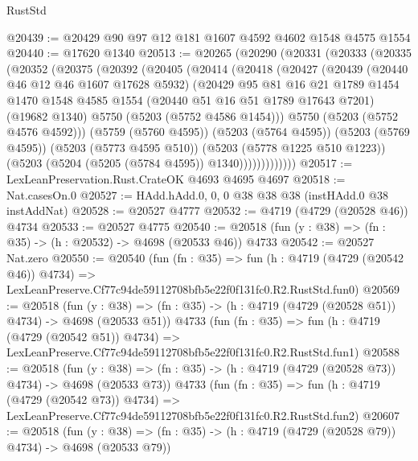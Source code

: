 \begin{lexlean}{RustStd}
\begin{coremodule}
@20439 := @20429 @90 @97 @12 @181 @1607 @4592 @4602 @1548 @4575 @1554
@20440 := @17620 @1340
@20513 := @20265
    (@20290
      (@20331
        (@20333
          (@20335
            (@20352
              (@20375
                (@20392
                  (@20405
                    (@20414
                      (@20418
                        (@20427
                          (@20439
                            (@20440 @46 @12 @46 @1607 @17628 @5932)
                            (@20429
                              @95
                              @81
                              @16
                              @21
                              @1789
                              @1454
                              @1470
                              @1548
                              @4585
                              @1554
                              (@20440 @51 @16 @51 @1789 @17643 @7201)
                              (@19682 @1340)
                              @5750
                              (@5203 (@5752 @4586 @1454)))
                            @5750
                            (@5203 (@5752 @4576 @4592)))
                          (@5759 (@5760 @4595))
                          (@5203 (@5764 @4595))
                          (@5203 (@5769 @4595))
                          (@5203 (@5773 @4595 @510))
                          (@5203 (@5778 @1225 @510 @1223))
                          (@5203 (@5204 (@5205 (@5784 @4595)) @1340)))))))))))))
@20517 := LexLeanPreservation.Rust.CrateOK @4693 @4695 @4697
@20518 := Nat.casesOn.{0}
@20527 := HAdd.hAdd.{0, 0, 0} @38 @38 @38 (instHAdd.{0} @38 instAddNat)
@20528 := @20527 @4777
@20532 := @4719 (@4729 (@20528 @46)) @4734
@20533 := @20527 @4775
@20540 := @20518 (fun (y : @38) => (fn : @35) -> (h : @20532) -> @4698 (@20533 @46)) @4733
@20542 := @20527 Nat.zero
@20550 := @20540
    (fun (fn : @35) =>
    fun (h : @4719 (@4729 (@20542 @46)) @4734) =>
    LexLeanPreserve.Cf77c94de59112708bfb5e22f0f131fc0.R2.RustStd.fun0)
@20569 := @20518
    (fun (y : @38) => (fn : @35) -> (h : @4719 (@4729 (@20528 @51)) @4734) -> @4698 (@20533 @51))
    @4733
    (fun (fn : @35) =>
    fun (h : @4719 (@4729 (@20542 @51)) @4734) =>
    LexLeanPreserve.Cf77c94de59112708bfb5e22f0f131fc0.R2.RustStd.fun1)
@20588 := @20518
    (fun (y : @38) => (fn : @35) -> (h : @4719 (@4729 (@20528 @73)) @4734) -> @4698 (@20533 @73))
    @4733
    (fun (fn : @35) =>
    fun (h : @4719 (@4729 (@20542 @73)) @4734) =>
    LexLeanPreserve.Cf77c94de59112708bfb5e22f0f131fc0.R2.RustStd.fun2)
@20607 := @20518
    (fun (y : @38) => (fn : @35) -> (h : @4719 (@4729 (@20528 @79)) @4734) -> @4698 (@20533 @79))

\end{coremodule}
\end{lexlean}
